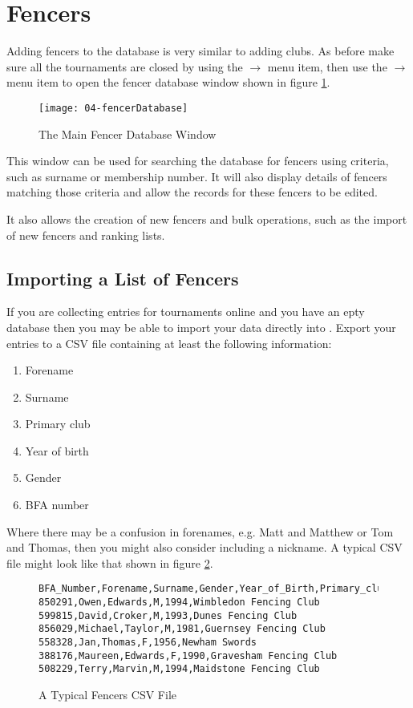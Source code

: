 \documentclass[a4paper,11pt]{memoir}
\begin{document}
\section{Fencers}\label{sec:fencers}
Adding fencers to the database is very similar to adding clubs. As before make sure all the tournaments are closed by using the  $\rightarrow$  menu item, then use the  $\rightarrow$  menu item to open the fencer database window shown in figure \ref{fig:04-fencerDatabase}.

\begin{figure}
 \centering
 \texttt{[image: 04-fencerDatabase]}
 \caption{The Main Fencer Database Window} \label{fig:04-fencerDatabase}
\end{figure}

This window can be used for searching the database for fencers using criteria, such as surname or \gls{membership number}. It will also display details of fencers matching those criteria and allow the records for these fencers to be edited. 

It also allows the creation of new fencers and bulk operations, such as the import of new fencers and ranking lists.

\subsection{Importing a List of Fencers}

If you are collecting entries for tournaments online and you have an epty database then you may be able to import your data directly into \fencingtime{}.  Export your entries to a CSV file containing at least the following information:

\begin{enumerate}
 \item Forename
 \item Surname
 \item Primary club
 \item Year of birth
 \item Gender
 \item BFA number
\end{enumerate}

Where there may be a confusion in forenames, e.g. Matt and Matthew or Tom and Thomas, then you might also consider including a nickname. 
A typical CSV file might look like that shown in figure \ref{fig:04-fencersCSV}.

\begin{figure}[!ht]
 \begin{verbatim}
BFA_Number,Forename,Surname,Gender,Year_of_Birth,Primary_club
850291,Owen,Edwards,M,1994,Wimbledon Fencing Club
599815,David,Croker,M,1993,Dunes Fencing Club
856029,Michael,Taylor,M,1981,Guernsey Fencing Club
558328,Jan,Thomas,F,1956,Newham Swords
388176,Maureen,Edwards,F,1990,Gravesham Fencing Club
508229,Terry,Marvin,M,1994,Maidstone Fencing Club
 \end{verbatim}
 \caption{A Typical Fencers CSV File} \label{fig:04-fencersCSV}
\end{figure}
\end{document}

